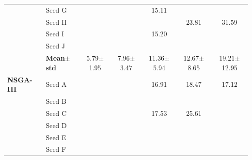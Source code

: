 \begin{table}[H]
{\begin{tabular}{@{}llccccc@{}}
  & Seed G & \cellcolor{RoyalBlue!10}{\small 3.76} & \cellcolor{RoyalBlue!10}{\small 5.44} & {\small\color{gray!60!black}15.11} & \cellcolor{RoyalBlue!10}{\small 6.72} & \cellcolor{RoyalBlue!10}{\small 7.16} \\
  & Seed H & \cellcolor{RoyalBlue!10}{\small 5.09} & \cellcolor{RoyalBlue!10}{\small 4.81} & \cellcolor{RoyalBlue!10}{\small 6.63} & {\small\color{gray!60!black}23.81} & {\small\color{gray!60!black}31.59} \\
  & Seed I & \cellcolor{RoyalBlue!10}{\small 4.98} & \cellcolor{RoyalBlue!10}{\small 4.92} & {\small\color{gray!60!black}15.20} & \cellcolor{RoyalBlue!10}{\small 7.02} & \cellcolor{RoyalBlue!10}{\small 7.28} \\
  & Seed J & \cellcolor{RoyalBlue!10}{\small 4.18} & \cellcolor{RoyalBlue!10}{\small 5.23} & \cellcolor{RoyalBlue!10}{\small 6.19} & \cellcolor{RoyalBlue!10}{\small 6.17} & \cellcolor{RoyalBlue!10}{\small 7.23} \\
 & \textbf{Mean$\pm$std} & \cellcolor{RoyalBlue!20}5.79$\pm$1.95 & \cellcolor{RoyalBlue!20}7.96$\pm$3.47 & \cellcolor{RoyalBlue!20}11.36$\pm$5.94 & \cellcolor{RoyalBlue!20}12.67$\pm$8.65 & \cellcolor{red!12}19.21$\pm$12.95 \\
\midrule
 \textbf{NSGA-III} & Seed A & \cellcolor{RoyalBlue!10}{\small 12.29} & \cellcolor{RoyalBlue!10}{\small 11.93} & {\small\color{gray!60!black}16.91} & {\small\color{gray!60!black}18.47} & {\small\color{gray!60!black}17.12} \\
  & Seed B & \cellcolor{RoyalBlue!10}{\small 6.97} & \cellcolor{RoyalBlue!10}{\small 8.50} & \cellcolor{RoyalBlue!10}{\small 8.80} & \cellcolor{RoyalBlue!10}{\small 9.61} & \cellcolor{RoyalBlue!10}{\small 11.33} \\
  & Seed C & \cellcolor{RoyalBlue!10}{\small 7.60} & \cellcolor{RoyalBlue!10}{\small 8.83} & {\small\color{gray!60!black}17.53} & {\small\color{gray!60!black}25.61} & \cellcolor{RoyalBlue!10}{\small 12.22} \\
  & Seed D & \cellcolor{RoyalBlue!10}{\small 4.48} & \cellcolor{RoyalBlue!10}{\small 10.13} & \cellcolor{RoyalBlue!10}{\small 5.38} & \cellcolor{RoyalBlue!10}{\small 6.92} & \cellcolor{RoyalBlue!10}{\small 8.22} \\
  & Seed E & \cellcolor{RoyalBlue!10}{\small 3.88} & \cellcolor{RoyalBlue!10}{\small 5.50} & \cellcolor{RoyalBlue!10}{\small 6.35} & \cellcolor{RoyalBlue!10}{\small 6.56} & \cellcolor{RoyalBlue!10}{\small 8.66} \\
  & Seed F & \cellcolor{RoyalBlue!10}{\small 5.40} & \cellcolor{RoyalBlue!10}{\small 5.45} & \cellcolor{RoyalBlue!10}{\small 5.51} & \cellcolor{RoyalBlue!10}{\small 6.06} & \cellcolor{RoyalBlue!10}{\small 7.13} \\

\end{tabular}}
\end{table}

